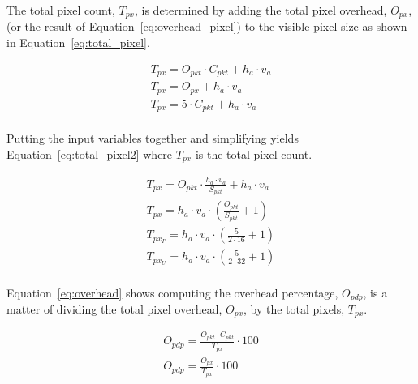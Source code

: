     The total pixel count, $T_{px}$, is determined by adding the total pixel overhead, $O_{px}$, (or the result of Equation~\eqref{eq:overhead_pixel}) to the visible pixel size as shown in Equation~\eqref{eq:total_pixel}.

    \begin{equation}
        \begin{array}{ l }
            \displaystyle T_{px}=O_{pkt} \cdot C_{pkt} + h_a \cdot v_a \\
            \displaystyle T_{px}=O_{px} + h_a \cdot v_a \\
            \displaystyle T_{px}=5\cdot C_{pkt} + h_a \cdot v_a \\[13pt]
        \end{array}
        \label{eq:total_pixel}
    \end{equation}

    Putting the input variables together and simplifying yields Equation~\eqref{eq:total_pixel2} where $T_{px}$ is the total pixel count.

    \begin{equation}
        \begin{array}{ l }
            \displaystyle T_{px}=O_{pkt} \cdot \frac{h_a \cdot v_a}{S_{pkt}} + h_a \cdot v_a \\[13pt]
            \displaystyle T_{px}=h_a \cdot v_a \cdot (\frac{O_{pkt}}{S_{pkt}} + 1) \\[13pt]
            \displaystyle T_{px_P}=h_a \cdot v_a \cdot (\frac{5}{2 \cdot 16} + 1) \\[13pt]
            \displaystyle T_{px_U}=h_a \cdot v_a \cdot (\frac{5}{2 \cdot 32} + 1) \\[13pt]
        \end{array}
        \label{eq:total_pixel2}
    \end{equation}

    Equation~\ref{eq:overhead} shows computing the overhead percentage, $O_{pdp}$, is a matter of dividing the total pixel overhead, $O_{px}$, by the total pixels, $T_{px}$.

    \begin{equation}
        \begin{array}{ l }
            \displaystyle O_{pdp}=\frac{O_{pkt}\cdot C_{pkt}}{T_{px}} \cdot 100 \\[13pt]
            \displaystyle O_{pdp}=\frac{O_{px}}{T_{px}} \cdot 100 \\[13pt]
        \end{array}
        \label{eq:overhead}
    \end{equation}

